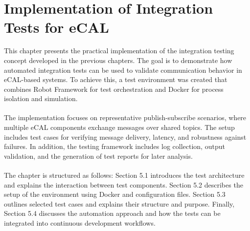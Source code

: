 \clearpage
\section{Implementation of Integration Tests for eCAL}

This chapter presents the practical implementation of the integration testing concept developed in the previous chapters. The goal is to demonstrate how automated integration tests can be used to validate communication behavior in eCAL-based systems. To achieve this, a test environment was created that combines Robot Framework for test orchestration and Docker for process isolation and simulation.
\\
\\
The implementation focuses on representative publish-subscribe scenarios, where multiple eCAL components exchange messages over shared topics. The setup includes test cases for verifying message delivery, latency, and robustness against failures. In addition, the testing framework includes log collection, output validation, and the generation of test reports for later analysis.
\\
\\
The chapter is structured as follows: Section 5.1 introduces the test architecture and explains the interaction between test components. Section 5.2 describes the setup of the environment using Docker and configuration files. Section 5.3 outlines selected test cases and explains their structure and purpose. Finally, Section 5.4 discusses the automation approach and how the tests can be integrated into continuous development workflows.

\newpage